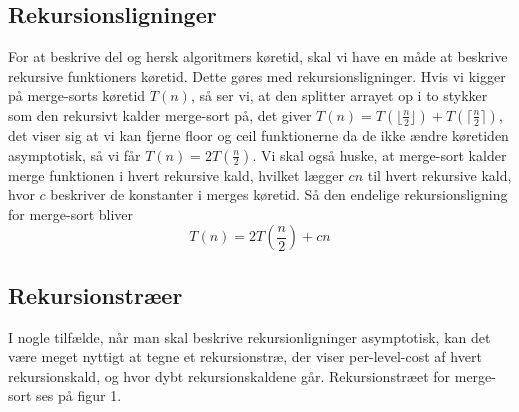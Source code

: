 \subsection{Rekursionsligninger}
For at beskrive del og hersk algoritmers køretid, skal vi have en måde at beskrive rekursive funktioners køretid. Dette gøres med rekursionsligninger. Hvis vi kigger på merge-sorts køretid $T(n)$, så ser vi, at den splitter arrayet op i to stykker som den rekursivt kalder merge-sort på, det giver $T(n) = T(\lfloor \frac{n}{2} \rfloor) + T(\lceil \frac{n}{2} \rceil)$, det viser sig at vi kan fjerne floor og ceil funktionerne da de ikke ændre køretiden asymptotisk, så vi får $T(n) = 2T(\frac{n}{2})$. Vi skal også huske, at merge-sort kalder merge funktionen i hvert rekursive kald, hvilket lægger $cn$ til hvert rekursive kald, hvor $c$ beskriver de konstanter i merges køretid. Så den endelige rekursionsligning for merge-sort bliver
$$T(n) = 2T(\frac{n}{2}) + cn$$
\subsection{Rekursionstræer}
I nogle tilfælde, når man skal beskrive rekursionligninger asymptotisk, kan det være meget nyttigt at tegne et rekursionstræ, der viser per-level-cost af hvert rekursionskald, og hvor dybt rekursionskaldene går. Rekursionstræet for merge-sort ses på figur 1.

